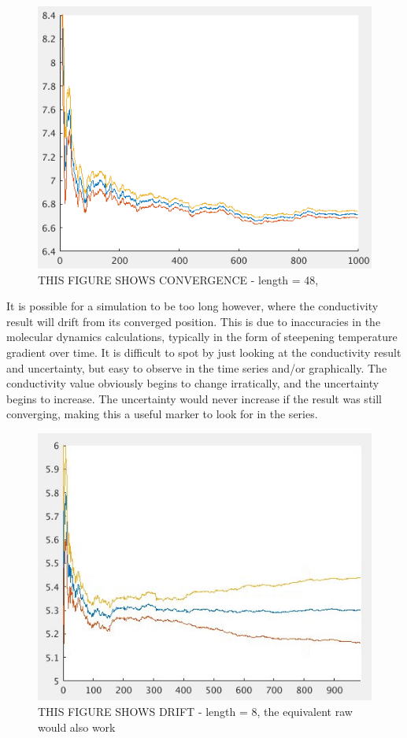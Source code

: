 \begin{figure}[h!]
\includegraphics[width=\linewidth]{Figures/direct_raw_conv_4000_2x2.png}
\caption[direct conv]{THIS FIGURE SHOWS CONVERGENCE - length = 48, }
\label{fig:direct_conv}
\end{figure}

\pagebreak

It is possible for a simulation to be too long however, where the conductivity result will drift from its converged position. This is due to inaccuracies in the molecular dynamics calculations, typically in the form of steepening temperature gradient over time. It is difficult to spot by just looking at the conductivity result and uncertainty, but easy to observe in the time series and/or graphically. The conductivity value obviously begins to change irratically, and the uncertainty begins to increase. The uncertainty would never increase if the result was still converging, making this a useful marker to look for in the series.

\begin{figure}[h!]
\includegraphics[width=\linewidth]{Figures/direct_trim_drift_4000_2x2.png}
\caption[direct conv]{THIS FIGURE SHOWS DRIFT - length = 8, the equivalent raw would also work}
\label{fig:direct_drift}
\end{figure}

